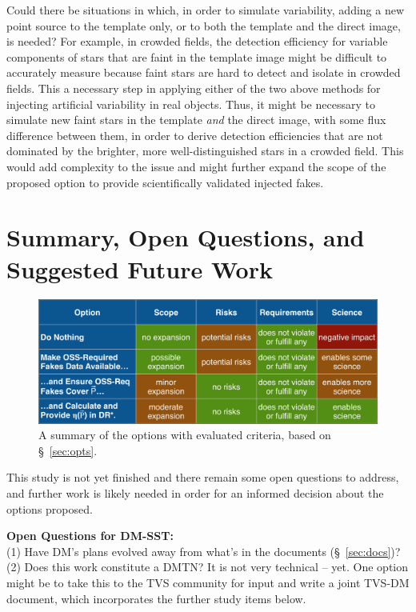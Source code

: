 \documentclass[DM,lsstdraft,toc]{lsstdoc}
\begin{document}
Could there be situations in which, in order to simulate variability, adding a new point source to the template only, or to both the template and the direct image, is needed? For example, in crowded fields, the detection efficiency for variable components of stars that are faint in the template image might be difficult to accurately measure because faint stars are hard to detect and isolate in crowded fields. This a necessary step in applying either of the two above methods for injecting artificial variability in real objects. Thus, it might be necessary to simulate new faint stars in the template {\it and} the direct image, with some flux difference between them, in order to derive detection efficiencies that are not dominated by the brighter, more well-distinguished stars in a crowded field. This would add complexity to the issue and might further expand the scope of the proposed option to provide scientifically validated injected fakes. 

\section{Summary, Open Questions, and Suggested Future Work}\label{sec:future}

\begin{figure}
\begin{center}
\includegraphics[width=15cm,trim={0cm 0cm 0cm 0cm}, clip]{figures/option_matrix.png}
\caption{A summary of the options with evaluated criteria, based on \S~\ref{sec:opts}. \label{fig:options}}
\end{center}
\end{figure}

This study is not yet finished and there remain some open questions to address, and further work is likely needed in order for an informed decision about the options proposed.

{\bf Open Questions for DM-SST:}\\
(1) Have DM's plans evolved away from what's in the documents (\S~\ref{sec:docs})? \\
(2) Does this work constitute a DMTN? It is not very technical -- yet. One option might be to take this to the TVS community for input and write a joint TVS-DM document, which incorporates the further study items below.
\end{document}
